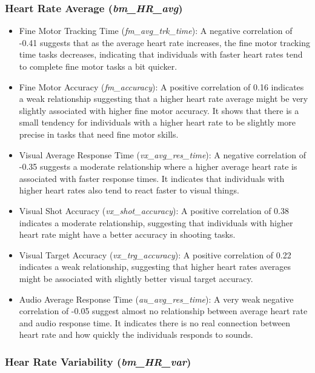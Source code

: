 \subsubsection*{Heart Rate Average (\textit{bm\_HR\_avg})}
\begin{itemize}
    \item Fine Motor Tracking Time (\textit{fm\_avg\_trk\_time}): A negative correlation of \\ -0.41 suggests that as the average heart rate increases, the fine motor
    tracking time tasks decreases, indicating that individuals with faster heart rates tend to complete fine motor tasks a bit quicker.
    \item Fine Motor Accuracy (\textit{fm\_accuracy}): A positive correlation of 0.16 indicates a weak relationship suggesting that a higher heart rate average might be very 
    slightly associated with higher fine motor accuracy. It shows that there is a small tendency for individuals with a higher heart rate to be slightly more precise
    in tasks that need fine motor skills.
    \item Visual Average Response Time (\textit{vx\_avg\_res\_time}): A negative correlation of -0.35 suggests a moderate relationship where a higher average heart rate
    is associated with faster response times. It indicates that individuals with higher heart rates also tend to react faster to visual things.
    \item Visual Shot Accuracy (\textit{vx\_shot\_accuracy}): A positive correlation of 0.38 indicates a moderate relationship, suggesting that individuals with higher heart
    rate might have a better accuracy in shooting tasks.
    \item Visual Target Accuracy (\textit{vx\_trg\_accuracy}): A positive correlation of 0.22 indicates a weak relationship, suggesting that higher heart rates averages might
    be associated with slightly better visual target accuracy.
    \item Audio Average Response Time (\textit{au\_avg\_res\_time}): A very weak negative correlation of -0.05 suggest almost no relationship between average heart rate
    and audio response time. It indicates there is no real connection between heart rate and how quickly the individuals responds to sounds.
\end{itemize}

\subsubsection*{Hear Rate Variability (\textit{bm\_HR\_var})}

